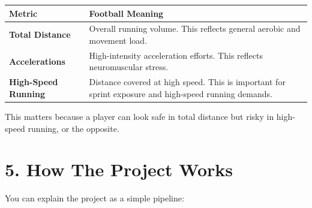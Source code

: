 \documentclass[11pt,a4paper]{article}
\begin{document}
\begin{center}
\begin{tabular}{>{\bfseries}p{4cm}p{10cm}}
\toprule
Metric & Football Meaning \\
\midrule
Total Distance & Overall running volume. This reflects general aerobic and movement load. \\
Accelerations & High-intensity acceleration efforts. This reflects neuromuscular stress. \\
High-Speed Running & Distance covered at high speed. This is important for sprint exposure and high-speed running demands. \\
\bottomrule
\end{tabular}
\end{center}

This matters because a player can look safe in total distance but risky in high-speed running, or the opposite.

\section*{5. How The Project Works}

You can explain the project as a simple pipeline:
\end{document}
